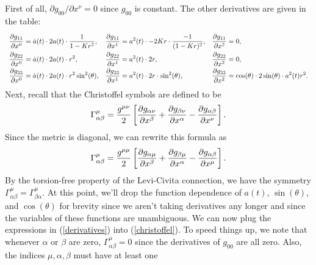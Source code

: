 \documentclass{lkx_pset}
\begin{document}
\begin{solution}
	First of all, $\partial g_{00}/\partial x^\nu = 0$ since $g_{00}$ is constant. The other derivatives are given in the table:
	\begin{equation}\label{derivatives}
		\everymath={\displaystyle}
		\renewcommand*{\arraystretch}{2}
		\begin{array}{lll}
			\pp{g_{11}}{x^0} = \dot{a}(t)\cdot 2a(t)\cdot \frac{1}{1-Kr^2},
			 & \pp{g_{11}}{x^1} = a^2(t)\cdot -2Kr\cdot \frac{-1}{(1-Kr)^2},
			 & \pp{g_{11}}{x^2} = 0,                                              \\
			\pp{g_{22}}{x^0} = \dot{a}(t)\cdot 2a(t)\cdot r^2,
			 & \pp{g_{22}}{x^1} = a^2(t)\cdot 2r,
			 & \pp{g_{22}}{x^2} = 0,                                              \\
			\pp{g_{33}}{x^0} = \dot{a}(t)\cdot 2a(t)\cdot r^2\sin^2(\theta),
			 & \pp{g_{33}}{x^1} = a^2(t)\cdot 2r\cdot \sin^2(\theta),
			 & \pp{g_{33}}{x^2} = \cos(\theta)\cdot 2\sin(\theta)\cdot a^2(t)r^2. \\
		\end{array}
	\end{equation}
	Next, recall that the Christoffel symbols are defined to be
	\[
		\Gamma^\mu_{\alpha\beta} = \frac{g^{\mu\nu}}{2}\left[\frac{\partial g_{\alpha\nu}}{\partial x^\beta} + \frac{\partial g_{\beta\nu}}{\partial x^\alpha} -\frac{\partial g_{\alpha\beta}}{\partial x^\nu}\right].
	\]
	Since the metric is diagonal, we can rewrite this formula as
	\begin{equation}\label{christoffel}
		\Gamma_{\alpha\beta}^\mu = \frac{g^{\mu\mu}}{2}\left[ \frac{\partial g_{\alpha \mu}}{\partial x^\beta} + \frac{\partial g_{\beta \mu}}{\partial x^\alpha} - \frac{\partial g_{\alpha\beta}}{\partial x^\mu}\right].
	\end{equation}
	By the torsion-free property of the Levi-Civita connection, we have the symmetry $\Gamma^\mu_{\alpha\beta}=\Gamma^\mu_{\beta\alpha}$. At this point, we'll drop the function dependence of $a(t)$, $\sin(\theta)$, and $\cos(\theta)$ for brevity since we aren't taking derivatives any longer and since the variables of these functions are unambiguous. We can now plug the expressions in (\ref{derivatives}) into (\ref{christoffel}). To speed things up, we note that whenever $\alpha$ or $\beta$ are zero, $\Gamma^\mu_{\alpha\beta}=0$ since the derivatives of $g_{00}$ are all zero. Also, the indices $\mu,\alpha,\beta$ must have at least one


\end{solution}
\end{document}
